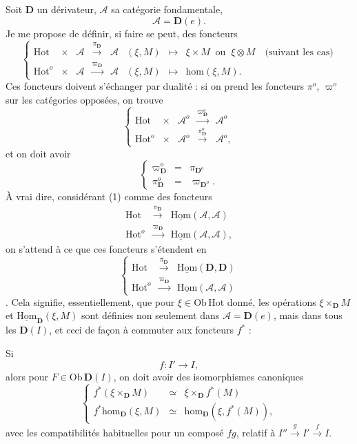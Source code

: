 \documentclass[11pt]{article}
\newcommand{\printedpage}[1]{\marginpar{\footnotesize p.~#1}}
\newcommand{\msp}[1]{\marginpar{\footnotesize [#1]}}
\newcommand{\Hot}{\mathrm{Hot}}
\newcommand{\D}{\mathbf{D}}
\newcommand{\uHom}{\underline{\mathrm{Hom}}}
\newcommand{\hm}{\mathrm{hom}}
\begin{document}
Soit $\D$ un dérivateur, $\mathcal{A}$ sa catégorie fondamentale,
\[
\mathcal{A} = \D(e).
\]
Je me propose de définir, si faire se peut, des foncteurs
\[
\left\{
\begin{array}{rccccccl}
\Hot & \times & \mathcal{A} & \xrightarrow{\pi_{\D}} & \mathcal{A} & (\xi, M) & \longmapsto & \xi \times M \ \text{ ou } \ \xi \otimes M \quad \text{(suivant les cas)}\\
\Hot^o & \times & \mathcal{A} & \xrightarrow{\varpi_{\D}} & \mathcal{A} & (\xi, M) & \longmapsto & \hm(\xi, M).
\end{array}
\right.
\tag*{(1)}
\]
Ces foncteurs doivent s'échanger par dualité : si on prend les foncteurs $\pi^o$, $\varpi^o$ sur les catégories opposées, on trouve
\[
\left\{
\begin{array}{rcccc}
\Hot & \times & \mathcal{A}^o & \xrightarrow{\varpi^o_{\D}} & \mathcal{A}^o\\
\Hot^o & \times & \mathcal{A}^o & \xrightarrow{\pi^o_{\D}} & \mathcal{A}^o,
\end{array}
\right.
\tag*{(1$'$)}
\]
et on doit avoir
\[
\left\{
\begin{array}{rcl}
\varpi^o_{\D} & = & \pi_{\D^o}\\
\pi^o_{\D} & = & \varpi_{\D^o}.
\end{array}
\right.
\]
À vrai dire, considérant (1) comme des foncteurs
\[
\begin{array}{rcl}
\Hot & \xrightarrow{\pi_{\D}} & \uHom(\mathcal{A}, \mathcal{A})\\
\Hot^o & \xrightarrow{\varpi_{\D}} & \uHom(\mathcal{A}, \mathcal{A}),
\end{array}
\]
on s'attend à ce que ces foncteurs s'étendent en
\[
\left\{
\begin{array}{rcl}
\Hot & \xrightarrow{\pi_{\D}} & \uHom(\D, \D)\\
\Hot^o & \xrightarrow{\varpi_{\D}} & \uHom(\mathcal{A}, \mathcal{A})
\end{array}
\right.
\tag*{(2)}
\]
. Cela signifie, essentiellement, que pour $\xi \in \mathrm{Ob}\,\Hot$ donné, les opérations $\xi \times_{\D} M$ et $\uHom_{\D}(\xi, M)$ sont définies non seulement dans $\mathcal{A} = \D(e)$, mais dans tous les $\D(I)$, et ceci de façon à commuter aux foncteurs $f^*$ :

\msp{page 2}
Si
\[
f : I' \longrightarrow I,
\]
\printedpage{2}
alors pour $F \in \mathrm{Ob}\,\D(I)$, on doit avoir des isomorphismes canoniques
\[
\left\{
\begin{array}{rcl}
f^*(\xi \times_{\D} M) & \simeq & \xi \times_{\D} f^*(M)\\
f^*\hm_{\D}(\xi, M) & \simeq & \hm_{\D}(\xi, f^*(M)),
\end{array}
\right.
\tag*{(3)}
\]
avec les compatibilités habituelles pour un composé $fg$, relatif à $I'' \xrightarrow{g} I' \xrightarrow{f} I$.
\end{document}
